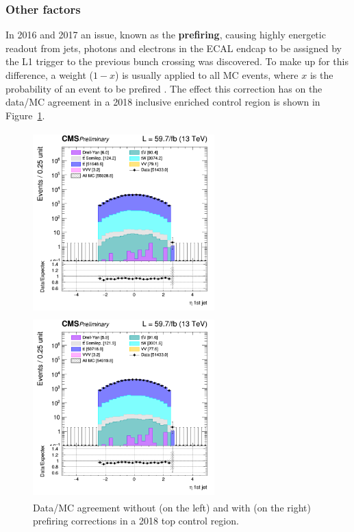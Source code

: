 \documentclass[a4paper, 10pt, openright]{report}
\begin{document}
\subsubsection{Other factors}

In 2016 and 2017 an issue, known as the \textbf{prefiring}, causing highly energetic readout from jets, photons and electrons in the \ac{ECAL} endcap to be assigned by the \ac{L1} trigger to the previous bunch crossing was discovered. To make up for this difference, a weight ($1-x$) is usually applied to all \ac{MC} events, where $x$ is the probability of an event to be prefired \cite{Prefire}. The effect this correction has on the data/\ac{MC} agreement in a 2018 inclusive enriched control region is shown in Figure~\ref{fig:Prefiring}.

\begin{figure}[htbp]
\begin{center}
\begin{minipage}[b]{.48\textwidth}
\includegraphics[width=7cm, height=7cm]{figs/log_cratio_ttbarCR_df_jeteta1_noPrefire.png}
\end{minipage} \hfill
\begin{minipage}[b]{.48\textwidth}
\includegraphics[width=7cm, height=7cm]{figs/log_cratio_ttbarCR_df_jeteta1.png}
\end{minipage} \hfill
\caption{Data/\ac{MC} agreement without (on the left) and with (on the right) prefiring corrections in a 2018 top control region.}
\label{fig:Prefiring}
\end{center}
\end{figure}
\end{document}
